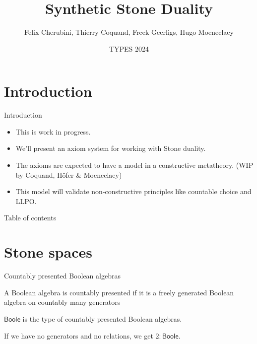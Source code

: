 \documentclass{beamer}
\newcommand{\Boole}{\mathsf{Boole}}
\newtheorem{remark}{Remark}
\begin{document}
\section{Introduction}

\title{Synthetic Stone Duality}
\date{TYPES 2024}
\author{
Felix Cherubini, Thierry Coquand, Freek Geerligs, Hugo Moeneclaey}
\maketitle
\begin{frame}{Introduction}
  \begin{itemize}
    \item This is work in progress. 
      \pause 
    \item We'll present an axiom system for working with Stone duality. 
      \pause 
    \item The axioms are expected to have a model in a constructive metatheory. 
      (WIP by Coquand, H\"ofer \& Moeneclaey)
      \pause
    \item 
      This model will validate non-constructive principles like countable choice and LLPO. 
  \end{itemize}
\end{frame}
\begin{frame}{Table of contents}
\tableofcontents
\end{frame}

  \section{Stone spaces}%
\begin{frame}{Countably presented Boolean algebras}
  \begin{definition}
    A Boolean algebra is countably presented if it is a 
    \pause freely generated Boolean algebra on countably many generators
  \end{definition}
  \pause 
  \pause
  \begin{definition}
    $\Boole$ is the type of countably presented Boolean algebras. 
  \end{definition}
  \pause 
  \begin{example}
    If we have no generators and no relations, we get $2:\Boole$.
  \end{example}
\end{frame}
\end{document}
